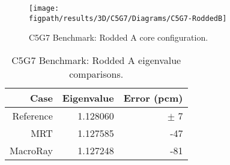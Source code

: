 {{{{        \begin{figure}[htbp]
          \centering
          \texttt{[image: \\figpath/results/3D/C5G7/Diagrams/C5G7-RoddedB]}
          \caption{C5G7 Benchmark: Rodded A core configuration. \label{fig:MR:C5G7:Rodded A}}
        \end{figure}

        \begin{table}[htbp]
          \centering
          \caption{C5G7 Benchmark: Rodded A eigenvalue comparisons. \label{tab:MR:C5G7:Rodded A-Eigenvalues}}
          \begin{tabular}{rrr}\toprule
            Case & Eigenvalue & Error (pcm)\\\midrule
            Reference & 1.128060 & $\pm$ 7\\
            MRT       & 1.127585 & -47\\
            MacroRay  & 1.127248 & -81\\\bottomrule
          \end{tabular}
        \end{table}

}}}}
